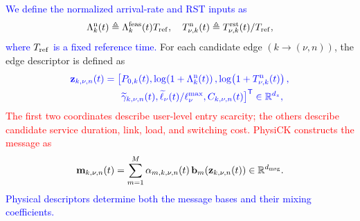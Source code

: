 \documentclass[10pt,letterpaper,journal]{IEEEtran}
\newcommand{\revnew}[1]{\textcolor{red}{#1}}
\begin{document}
\textcolor{blue}{We define the normalized arrival-rate and RST inputs as
\begin{equation}
\begin{aligned}
\Lambda_k^{\mathrm n}(t)
\triangleq \Lambda_k^{\rm feas}(t)T_{\rm ref}, \quad T_{\nu,k}^{\mathrm n}(t)
\triangleq T_{\nu,k}^{\rm rst}(t)/T_{\rm ref},
\end{aligned}   
\label{eq:normalized}
\end{equation}
where $T_{\rm ref}$ is a fixed reference time.}
For each candidate edge $(k\!\to\!(\nu,n))$, the edge descriptor is defined as
\begin{equation}
\textcolor{blue}{\begin{aligned}
\mathbf z_{k,\nu,n}(t)
=\big[&
P_{0,k}(t),
\log\!\left(1+\Lambda_k^{\rm n}(t)\right),
\log\!\left(1+{T_{\nu,k}^{\rm n}(t)}\right),\\
&\widetilde{\gamma}_{k,\nu,n}(t),
\widetilde{\ell}_{\nu}(t)/\ell_{\nu}^{\max},
 C_{k,\nu,n}(t)
\big]^{\mathsf T}
\in\mathbb R^{d_z},
\end{aligned}}
\label{eq:z_main}
\end{equation}
\revnew{The first two coordinates describe user-level entry scarcity; the others describe candidate service duration, link, load, and switching cost. PhysiCK constructs the message as}
\begin{equation}
\mathbf{m}_{k,\nu,n}(t)=\sum_{m=1}^{M}\alpha_{m,k,\nu,n}(t)\,\mathbf{b}_m(\mathbf{z}_{k,\nu,n}(t))\in\mathbb{R}^{d_{\rm msg}}.
\label{eq:msg_kernel_main}
\end{equation}
\textcolor{blue}{Physical descriptors determine both the message bases and their mixing coefficients.}
\end{document}
